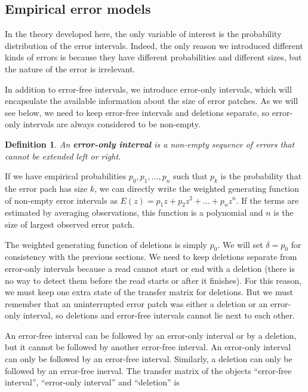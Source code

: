 \documentclass{article}
\newtheorem{definition}{Definition}
\begin{document}

\subsection{Empirical error models}
\label{subsec:empirical}

In the theory developed here, the only variable of interest is the
probability distribution of the error intervals. Indeed, the only reason
we introduced different kinds of errors is because they have different
probabilities and different sizes, but the nature of the error is
irrelevant.

In addition to error-free intervals, we introduce error-only intervals,
which will encapsulate the available information about the size of error
patches. As we will see below, we need to keep error-free intervals and
deletions separate, so error-only intervals are always considered to be
non-empty.

\begin{definition}
\label{def:error-interval}
An \textbf{error-only interval} is a non-empty sequence of errors that
cannot be extended left or right.
\end{definition}

If we have empirical probabilities $p_0, p_1, \ldots, p_n$ such that $p_k$
is the probability that the error pach has size $k$, we can directly write
the weighted generating function of non-empty error intervals as $E(z) =
p_1z + p_2z^2 + \ldots + p_nz^n$. If the terms are estimated by averaging
observations, this function is a polynomial and $n$ is the size of largest
observed error patch.

The weighted generating function of deletions is simply $p_0$. We will set
$\delta = p_0$ for consistency with the previous sections. We need to keep
deletions separate from error-only intervals because a read cannot start
or end with a deletion (there is no way to detect them before the read
starts or after it finishes). For this reason, we must keep one extra
state of the transfer matrix for deletions. But we must remember that an
uninterrupted error patch was either a deletion or an error-only interval,
so deletions and error-free intervals cannot lie next to each other.

An error-free interval can be followed by an error-only interval or by a
deletion, but it cannot be followed by another error-free interval. An
error-only interval can only be followed by an error-free interval.
Similarly, a deletion can only be followed by an error-free inerval. The
transfer matrix of the objects ``error-free interval'', ``error-only
interval'' and ``deletion'' is
\end{document}
